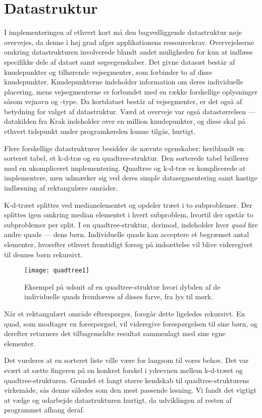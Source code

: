 \section{Datastruktur}
\label{sec:datastruktur}
I implementeringen af ethvert kort må den bagvedliggende datastruktur nøje overvejes, da denne i høj grad afgør applikationens ressourcekrav. Overvejelserne omkring datastrukturen involverede blandt andet muligheden for kun at indlæse specifikke dele af dataet samt søgeegenskaber. Det givne datasæt består af knudepunkter og tilhørende vejsegmenter, som forbinder to af disse knudepunkter. Knudepunkterne indeholder information om deres individuelle placering, mens vejsegmenterne er forbundet med en række forskellige oplysninger såsom vejnavn og -type. Da kortdataet består af vejsegmenter, er det også af betydning for valget af datastruktur. Værd at overveje var også datastørrelsen --- datakilden fra Krak indeholder over en million knudepunkter, og disse skal på ethvert tidspunkt under programkørslen kunne tilgås, hurtigt.

Flere forskellige datastrukturer besidder de nævnte egenskaber: heriblandt en sorteret tabel, et k-d-træ og en quadtree-struktur. Den sorterede tabel brillerer med en ukompliceret implementering. Quadtree og k-d-træ er komplicerede at implementere, men udmærker sig ved deres simple datasegmentering samt hastige indlæsning af rektangulære områder.

K-d-træet splittes ved medianelementet og opdeler træet i to subproblemer. Der splittes igen omkring median elementet i hvert subproblem, hvortil der opstår to subproblemer per split. I en quadtree-struktur, derimod, indeholder hver \emph{quad} fire andre quads --- dens børn. Individuelle quads kan acceptere et begrænset antal elementer, hvorefter ethvert fremtidigt forsøg på indsættelse vil blive videregivet til dennes børn rekursivt.
\begin{figure}[ht!]
	\centering
	\texttt{[image: quadtree1]}
	\captionsetup{width=0.8\textwidth}
	\caption{Eksempel på udsnit af en quadtree-struktur hvori dybden af de individuelle quads fremhæves af disses farve, fra lys til mørk.}
	\label{fig:quadtree1}
\end{figure}
Når et rektangulært område efterspørges, foregår dette ligeledes rekursivt. En quad, som modtager en forespørgsel, vil videregive forespørgelsen til sine børn, og derefter returnere det tilbagemeldte resultat sammenlagt med sine egne elementer.

Det vurderes at en sorteret liste ville være for langsom til vores behov. Det var svært at sætte fingeren på en konkret forskel i ydeevnen mellem k-d-træet og quadtree-strukturen. Grundet et langt større kendskab til quadtree-strukturens virkemåde, sås denne således som den mest passende løsning. Vi fandt det vigtigt at vælge og udarbejde datastrukturen hurtigt, da udviklingen af resten af programmet afhang deraf.

